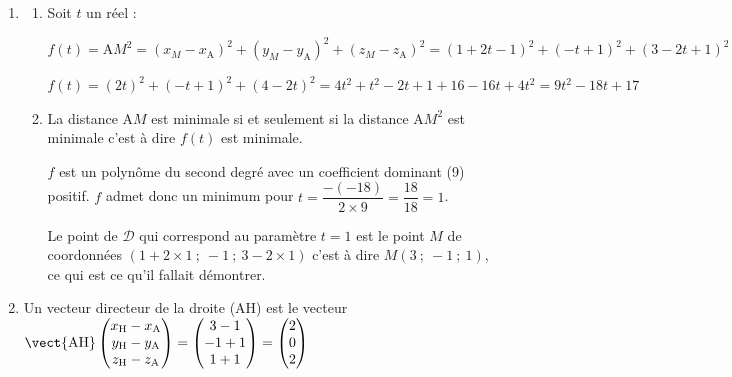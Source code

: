 \begin{enumerate}
\begin{enumerate}
$\left\{\begin{array}{@{}l} x_{\mathrm{A}}=1+2t\\y_{\mathrm{A}}=-t\\z_{\mathrm{A}}=3-2t\end{array}\right. 	
\iff \left\{\begin{array}{@{}l} 1=1+2t\\-1=-t\\-1=3-2t\end{array}\right. 	  
\iff \left\{\begin{array}{@{}l} 0=2t\\1=t\\2t=4\end{array}\right. 	  
\iff \left\{\begin{array}{@{}l} t=0\\t=1\\t=2\end{array}\right. $

Ce système n'admet pas de solution donc le point A n'appartient donc pas à la droite $\mathcal{D}$.
\end{enumerate}

\item
	\begin{enumerate}
		\item  Soit $t$ un réel :

$f(t)=\mathrm{A}M^2= {(x_M - x_\mathrm{A})^2+(y_M - y_\mathrm{A})^2+(z_M - z_\mathrm{A})^2} ={ (1+2t-1)^2+ (-t+1)^2+(3-2t+1)^2    }$

$f(t) ={ (2t)^2+ (-t+1)^2+(4-2t)^2  } 
={ 4t^2+ t^2-2t+1+16-16t+4t^2    }= 9t^2-18t+17$ 

	\item La distance A$M$ est minimale si et seulement si la distance A$M^2$ est minimale c'est à dire $f(t)$ est minimale.

	$f$ est un polynôme du second degré avec un coefficient dominant (9)  positif.  $f$ admet donc un minimum pour $t=\dfrac{-(-18)}{2\times 9} = \dfrac{18}{18}=1$.
	
	Le point de $\mathcal{D}$ qui correspond au paramètre $t=1$ est le point $M$ de coordonnées $(1+2\times 1~;~-1~;~3-2\times 1)$ c'est à dire $M(3~;~-1~;~1)$, ce qui est ce qu'il fallait démontrer.

	\end{enumerate}

\item Un vecteur directeur de la droite (AH) est le vecteur $\vect{\mathrm{AH}} \begin{pmatrix} x_\mathrm{H}-x_\mathrm{A}\\y_\mathrm{H}-y_\mathrm{A}\\z_\mathrm{H}-z_\mathrm{A} \end{pmatrix} = \begin{pmatrix} 3-1\\-1+1\\1+1\end{pmatrix}= \begin{pmatrix} 2\\0\\2\end{pmatrix}$


\end{enumerate}
